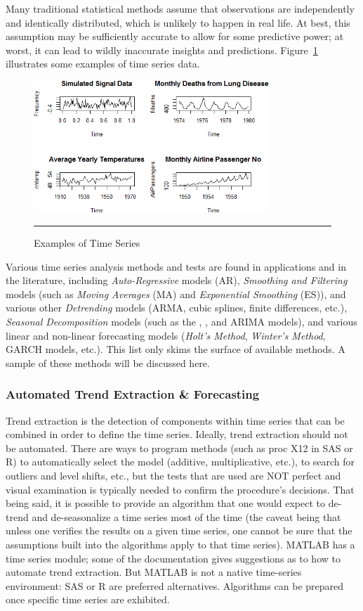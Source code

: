 Many traditional statistical methods assume that observations are independently and identically distributed, which is unlikely to happen in real life. At best, this assumption may be sufficiently accurate to allow for some predictive power; at worst, it can lead to wildly inaccurate insights and predictions. Figure~\ref{fig:example} illustrates some examples of time series data. 
\begin{figure}[t]
\centering
\includegraphics[width=0.79\textwidth]{images/TS/Example.png}
\caption{Examples of Time Series}\hrule
\label{fig:example}
\end{figure}
Various time series analysis methods and tests are found in applications and in the literature, including \textit{Auto-Regressive} models (AR), \textit{Smoothing and Filtering} models (such as \textit{Moving Averages} (MA) and \textit{Exponential Smoothing} (ES)), and various other \textit{Detrending} models (ARMA, cubic splines, finite differences, etc.), \textit{Seasonal Decomposition} models (such as the , ,  and ARIMA models), and various linear and non-linear forecasting models (\textit{Holt's Method}, \textit{Winter's Method}, GARCH models, etc.). This list only skims the surface of available methods. A sample of these methods will be discussed here.

\subsubsection{Automated Trend Extraction \& Forecasting} 
Trend extraction is the detection of components within time series that can be combined in order to define the time series. Ideally, trend extraction should not be automated. There are ways to program methods (such as proc X12 in SAS or R) to automatically select the model (additive, multiplicative, etc.), to search for outliers and level shifts, etc., but the tests that are used are NOT perfect and visual examination is typically needed to confirm the procedure's decisions. That being said, it is possible to provide an algorithm that one would expect to de-trend and de-seasonalize a time series most of the time (the caveat being that unless one verifies the results on a given time series, one cannot be sure that the assumptions built into the algorithms apply to that time series). MATLAB has a time series module; some of the documentation gives suggestions as to how to automate trend extraction. But MATLAB is not a native time-series environment: SAS or R are preferred alternatives. Algorithms can be prepared once specific time series are exhibited. 

